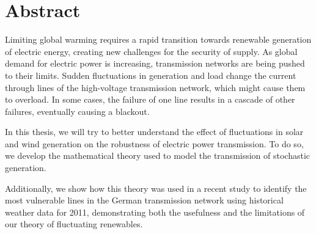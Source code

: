\documentclass{report}
\title{\thesistitle}
\author{\thesisauthorfirst\space\thesisauthorsecond}
\date{\thesisdate}
\theoremstyle{definition}
\theoremstyle{remark}
\begin{document}



\chapter*{Abstract}
\vspace{1cm}
Limiting global warming requires a rapid transition towards renewable generation of electric energy, creating new challenges for the security of supply. As global demand for electric power is increasing, transmission networks are being pushed to their limits. 
Sudden fluctuations in generation and load change the current through lines of the high-voltage transmission network, which might cause them to overload. In some cases, the failure of one line results in a cascade of other failures, eventually causing a blackout.

In this thesis, we will try to better understand the effect of fluctuations in solar and wind generation on the robustness of electric power transmission. To do so, we develop the mathematical theory used to model the transmission of stochastic generation.

Additionally, we show how this theory was used in a recent study \citep{Nesti2018emergentfailures} to identify the most vulnerable lines in the German transmission network using historical weather data for 2011, demonstrating both the usefulness and the limitations of our theory of fluctuating renewables.
\end{document}
